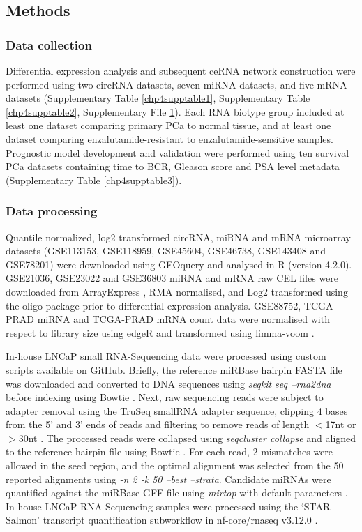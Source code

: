 \subsection{Methods}\label{sec2}

\subsubsection{Data collection}\label{methods1}
Differential expression analysis and subsequent ceRNA network construction were performed using two circRNA datasets, seven miRNA datasets, and five mRNA datasets (Supplementary Table \ref{chp4supptable1}, Supplementary Table \ref{chp4supptable2}, Supplementary File \hyperlink{chp4suppfile1}{1}). Each RNA biotype group included at least one dataset comparing primary PCa to normal tissue, and at least one dataset comparing enzalutamide-resistant to enzalutamide-sensitive samples. Prognostic model development and validation were performed using ten survival PCa datasets containing time to BCR, Gleason score and PSA level metadata (Supplementary Table \ref{chp4supptable3}).

\subsubsection{Data processing}\label{methods2}
Quantile normalized, log2 transformed circRNA, miRNA and mRNA microarray datasets (GSE113153, GSE118959, GSE45604, GSE46738, GSE143408 and GSE78201) were downloaded using GEOquery \cite{Davis2007} and analysed in R (version 4.2.0). GSE21036, GSE23022 and GSE36803 miRNA and mRNA raw CEL files were downloaded from ArrayExpress \cite{Parkinson2007}, RMA normalised, and Log2 transformed using the oligo package \cite{Carvalho2010} prior to differential expression analysis. GSE88752, TCGA-PRAD miRNA and TCGA-PRAD mRNA count data were normalised with respect to library size using edgeR \cite{Robinson2010Jan} and transformed using limma-voom \cite{Law2014Feb}. 

In-house LNCaP small RNA-Sequencing data were processed using custom scripts available on GitHub. Briefly, the reference miRBase hairpin FASTA file was downloaded and converted to DNA sequences using \textit{seqkit seq --rna2dna} before indexing using Bowtie \cite{Bowtie, Shen2016}. Next, raw sequencing reads were subject to adapter removal using the TruSeq smallRNA adapter sequence, clipping 4 bases from the 5' and 3' ends of reads and filtering to remove reads of length $<$17nt or $>$30nt \cite{Krueger2023}. The processed reads were collapsed using \textit{seqcluster collapse} and aligned to the reference hairpin file using Bowtie \cite{Pantano2016, Bowtie}. For each read, 2 mismatches were allowed in the seed region, and the optimal alignment was selected from the 50 reported alignments using \textit{-n 2 -k 50 --best --strata}. Candidate miRNAs were quantified against the miRBase GFF file using \textit{mirtop} with default parameters \cite{Desvignes2020}. In-house LNCaP RNA-Sequencing samples were processed using the `STAR-Salmon' transcript quantification subworkflow in nf-core/rnaseq v3.12.0 \cite{Patel2023}. 

